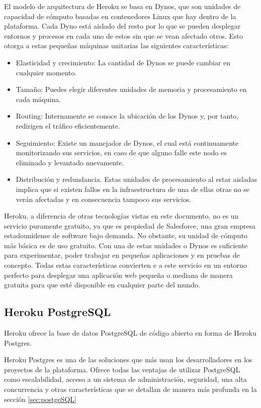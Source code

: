 \documentclass[a4paper, 12pt]{book}
\begin{document}
El modelo de arquitectura de Heroku se basa en Dynos, que son unidades de capacidad de cómputo basadas en contenedores Linux que hay dentro de la plataforma. Cada Dyno está aislado del resto por lo que se pueden desplegar entornos y procesos en cada uno de estos sin que se vean afectado otros. Esto otorga a estas pequeñas máquinas unitarias las siguientes características: 
\begin{itemize}
	\item Elasticidad y crecimiento: La cantidad de Dynos se puede cambiar en cualquier momento. 
	\item Tamaño: Puedes elegir diferentes unidades de memoria y procesamiento en cada máquina. 
	\item Routing: Internamente se conoce la ubicación de los Dynos y, por tanto, redirigen el tráfico eficientemente. 
	\item Seguimiento: Existe un manejador de Dynos, el cual está continuamente monitorizando sus servicios, en caso de que alguno falle este nodo es eliminado y levantado nuevamente. 
	\item Distribución y redundancia. Estas unidades de procesamiento al estar aisladas implica que si existen fallos en la infraestructura de una de ellas otras no se verán afectadas y en consecuencia tampoco sus servicios. 	
\end{itemize}

Heroku, a diferencia de otras tecnologías vistas en este documento, no es un servicio puramente gratuito, ya que es propiedad de Salesforce, una gran empresa estadounidense de software bajo demanda. No obstante, su unidad de cómputo más básica es de uso gratuito. Con una de estas unidades o Dynos es suficiente para experimentar, poder trabajar en pequeñas aplicaciones y en pruebas de concepto. Todas estas características convierten e a este servicio en un entorno perfecto para desplegar una aplicación web pequeña o mediana de manera gratuita para que esté disponible en cualquier parte del mundo. 
\subsection{Heroku PostgreSQL}
Heroku ofrece la base de datos PostgreSQL de código abierto en forma de Heroku Postgres. 

Heroku Postgres es una de las soluciones que más usan los desarrolladores en los proyectos de la plataforma. Ofrece todas las ventajas de utilizar PostgreSQL como escalabilidad, acceso a un sistema de administración, seguridad, una alta concurrencia y otras características que se detallan de manera más profunda en la sección \ref{sec:postgeSQL}
\end{document}
